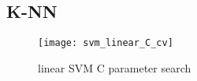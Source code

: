 
\subsection{K-NN}%
\label{sub:knn}
\begin{figure}[H]
    \centering
    \texttt{[image: svm\_linear\_C\_cv]}
    \caption{linear SVM C parameter search}%
    \label{fig:svm_linear_C_cv}
\end{figure}
